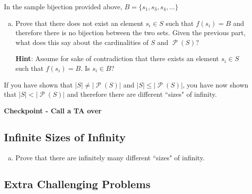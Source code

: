 \documentclass[12pt,letterpaper]{article}
\newcommand\Pow{\ensuremath{\operatorname{\mathcal{P}}}}
\newcommand\hint[1]{\textbf{Hint}: #1}
\newenvironment{22enumerate}{\begin{enumerate}[a.]\itemsep0em}{\end{enumerate}}
\newif\ifsol
\newcommand{\solu}[2]{ \begin{mdframed} \ifsol #2 \else \vspace{#1} \fi \end{mdframed} }
\begin{document}
      In the sample bijection provided above, $B = \{s_1, s_3, s_4, ... \}$
      \begin{22enumerate}
              \setcounter{enumi}{2}
      \item Prove that there does not exist an element $s_i \in S$ such that
       $f(s_i) = B$ and therefore there is no bijection between the two sets.
      Given the previous part, what does this
      say about the cardinalities of $S$ and $\Pow(S)$?

      \hint Assume for sake of contradiction that there exists
      an element $s_i \in S$ such that $f(s_i) = B$. Is $s_i \in B$?

        \solu{4cm}{If $s_i$ were in $B$, then by the definition of $B$, $s_i$ is not mapped to an element that contains it. Since $s_i$ maps to $B$, we have reached a contradiction.

If $s_i$ were not in $B$, then $s_i$ does not map to an element that contains it. Therefore $B$ should contain $s_i$. 
t
 }

      \end{22enumerate}

      If you have shown that $ |S| \neq |\Pow(S)| $ and $|S| \leq |\Pow(S)|$,
      you have now shown that $|S| < |\Pow(S)|$ and therefore there are
      different ``sizes" of infinity.

	\textbf{Checkpoint - Call a TA over}

      \subsection*{Infinite Sizes of Infinity}

      \begin{22enumerate}
        \setcounter{enumi}{3}
      \item Prove that there are infinitely many different ``sizes" of infinity.

	\solu{4cm}{Assume for sake of contradiction that there is a largest size of infinity. Now take the power set}


      \end{22enumerate}

      \subsection*{Extra Challenging Problems}
\end{document}
